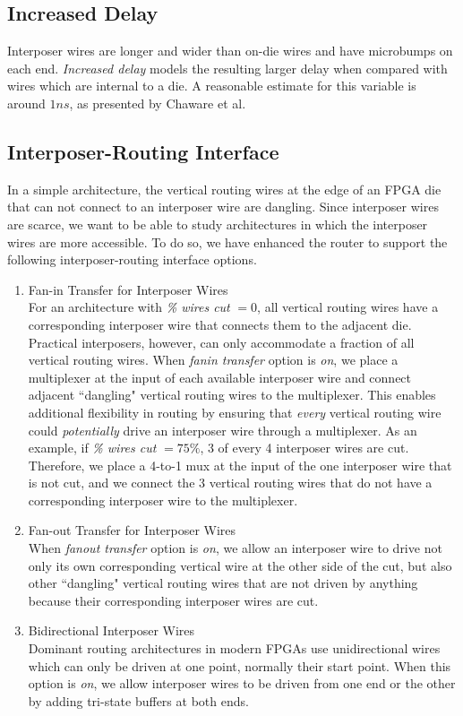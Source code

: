 \documentclass[journal]{IEEEtran}
\begin{document}
\subsection{Increased Delay}
Interposer wires are longer and wider than on-die wires and have microbumps on each end. \textit{Increased delay} models the resulting larger delay when compared with wires which are internal to a die. A reasonable estimate for this variable is around $1ns$, as presented by Chaware et al\cite{xilinxTSV}.

\subsection{Interposer-Routing Interface}
\label{sec:interposer-routing-interface}
In a simple architecture, the vertical routing wires at the edge of an FPGA die that can not connect to an interposer wire are dangling. Since interposer wires are scarce, we want to be able to study architectures in which the interposer wires are more accessible. To do so, we have enhanced the router to support the following interposer-routing interface options.

\begin{enumerate}
\item Fan-in Transfer for Interposer Wires\\
For an architecture with \textit{\% wires cut} $=0$, all vertical routing wires have a corresponding interposer wire that connects them to the adjacent die. Practical interposers, however, can only accommodate a fraction of all vertical routing wires. When \textit{fanin transfer} option is \textit{on}, we place a multiplexer at the input of each available interposer wire and connect adjacent ``dangling" vertical routing wires to the multiplexer. This enables additional flexibility in routing by ensuring that \textit{every} vertical routing wire could \textit{potentially} drive an interposer wire through a multiplexer. As an example, if \textit{\% wires cut} $=75\%$, 3 of every 4 interposer wires are cut. Therefore, we place a 4-to-1 mux at the input of the one interposer wire that is not cut, and we connect the 3 vertical routing wires that do not have a corresponding interposer wire to the multiplexer. 

\item Fan-out Transfer for Interposer Wires\\
When \textit{fanout transfer} option is \textit{on}, we allow an interposer wire to drive not only its own corresponding vertical wire at the other side of the cut, but also other ``dangling" vertical routing wires that are not driven by anything because their corresponding interposer wires are cut.

\item Bidirectional Interposer Wires\\
Dominant routing architectures in modern FPGAs use unidirectional wires~\cite{unidirectional, lewis2005stratix} which can only be driven at one point, normally their start point. When this option is \textit{on}, we allow interposer wires to be driven from one end or the other by adding tri-state buffers at both ends.
\end{enumerate}
\end{document}
